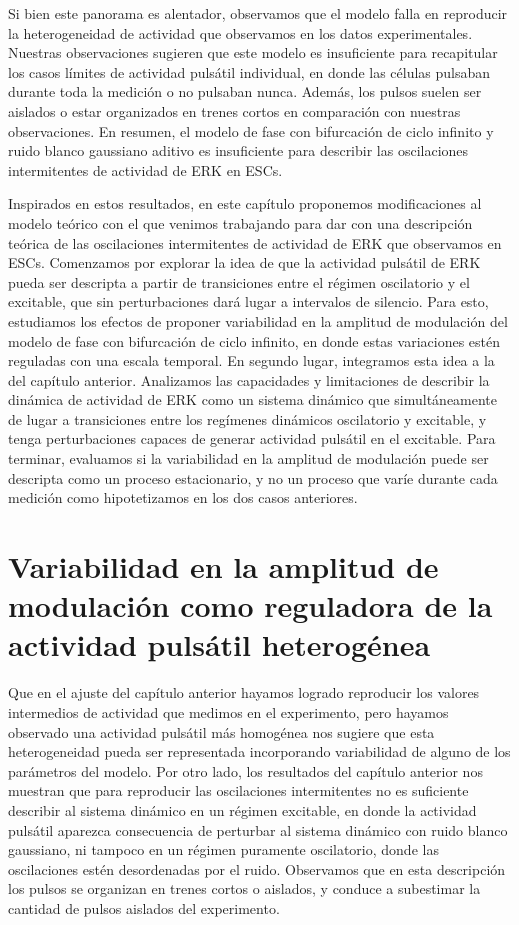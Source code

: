 \documentclass[./main.tex]{subfiles}
\begin{document}
Si bien este panorama es alentador, observamos que el modelo falla en reproducir la heterogeneidad de actividad que observamos en los datos experimentales. Nuestras observaciones sugieren que este modelo es insuficiente para recapitular los casos límites de actividad pulsátil individual, en donde las células pulsaban durante toda la medición o no pulsaban nunca. Además, los pulsos suelen ser aislados o estar organizados en trenes cortos en comparación con nuestras observaciones. En resumen, el modelo de fase con bifurcación de ciclo infinito y ruido blanco gaussiano aditivo es insuficiente para describir las oscilaciones intermitentes de actividad de ERK en ESCs. 

Inspirados en estos resultados, en este capítulo proponemos modificaciones al modelo teórico con el que venimos trabajando para dar con una descripción teórica de las oscilaciones intermitentes de actividad de ERK que observamos en ESCs. Comenzamos por explorar la idea de que la actividad pulsátil de ERK pueda ser descripta a partir de transiciones entre el régimen oscilatorio y el excitable, que sin perturbaciones dará lugar a intervalos de silencio. Para esto, estudiamos los efectos de proponer variabilidad en la amplitud de modulación del modelo de fase con bifurcación de ciclo infinito, en donde estas variaciones estén reguladas con una escala temporal. En segundo lugar, integramos esta idea a la del capítulo anterior. Analizamos las capacidades y limitaciones de describir la dinámica de actividad de ERK como un sistema dinámico que simultáneamente de lugar a transiciones entre los regímenes dinámicos oscilatorio y excitable, y tenga perturbaciones capaces de generar actividad pulsátil en el excitable. Para terminar, evaluamos si la variabilidad en la amplitud de modulación puede ser descripta como un proceso estacionario, y no un proceso que varíe durante cada medición como hipotetizamos en los dos casos anteriores.  


\section{Variabilidad en la amplitud de modulación como reguladora de la actividad pulsátil heterogénea}
\label{C7_sec:OU}

Que en el ajuste del capítulo anterior hayamos logrado reproducir los valores intermedios de actividad que medimos en el experimento, pero hayamos observado una actividad pulsátil más homogénea nos sugiere que esta heterogeneidad pueda ser representada incorporando variabilidad de alguno de los parámetros del modelo. Por otro lado, los resultados del capítulo anterior nos muestran que para reproducir las oscilaciones intermitentes no es suficiente describir al sistema dinámico en un régimen excitable, en donde la actividad pulsátil aparezca consecuencia de perturbar al sistema dinámico con ruido blanco gaussiano, ni tampoco en un régimen puramente oscilatorio, donde las oscilaciones estén desordenadas por el ruido. Observamos que en esta descripción los pulsos se organizan en trenes cortos o aislados, y conduce a subestimar la cantidad de pulsos aislados del experimento.
\end{document}
